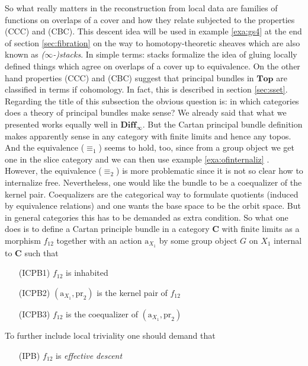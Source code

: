 \begin{exa}[Bundles 2]
\begin{enumerate}
\end{enumerate}
So what really matters in the reconstruction from local data are families of functions on overlaps of a cover and how they relate subjected to the properties (CCC) and (CBC). This {\glqq}descent{\grqq} idea will be used in example \ref{exa:gs4} at the end of section \ref{sec:fibration} on the way to {\glqq}homotopy-theoretic{\grqq} sheaves which are also known as \textit{($\infty$-)stacks}. In simple terms: stacks formalize the idea of gluing locally defined things which agree on overlaps of a cover up to equivalence. On the other hand properties (CCC) and (CBC) suggest that principal bundles in $\mathbf{Top}$ are classified in terms if cohomology. In fact, this is described in section \ref{sec:sset}.
\\
Regarding the title of this subsection the obvious question is: in which categories does a theory of principal bundles make sense? We already said that what we presented works equally well in $\mathbf{Diff}_{\infty}$. But the Cartan principal bundle definition makes apparently sense in any category with finite limits and hence any topos. And the equivalence ($\equiv_{1}$) seems to hold, too, since from a group object we get one in the slice category and we can then use example \ref{exa:ofinternaliz} . However, the equivalence ($\equiv_{2}$) is more problematic since it is not so clear how to internalize {\glqq}free{\grqq}. Nevertheless, one would like the bundle to be a coequalizer of the kernel pair. Coequalizers are the categorical way to formulate quotients (induced by equivalence relations) and one wants the base space to be the orbit space. But in general categories this has to be demanded as extra condition. So what one does is to define a Cartan principle bundle in a category $\mathbf{C}$ with finite limits as a morphism $f_{12}$ together with an action $\mathrm{a}_{X_{1}}$ by some group object $G$ on $X_{1}$ internal to $\mathbf{C}$ such that
\begin{enumerate}
\item[(ICPB1)]
$f_{12}$ is inhabited
\item[(ICPB2)]
$(\mathrm{a}_{X_{1}},\mathrm{pr}_{2})$ is the kernel pair of $f_{12}$
\item[(ICPB3)]
$f_{12}$ is the coequalizer of $(\mathrm{a}_{X_{1}},\mathrm{pr}_{2})$
\end{enumerate}
To further include local triviality one should demand that
\begin{enumerate}
\item[(IPB)]
$f_{12}$ is \textit{effective descent}

\end{enumerate}
\end{exa}
